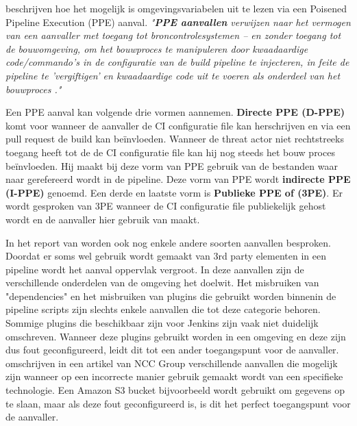 \textcite{Security2022} beschrijven hoe het mogelijk is omgevingsvariabelen uit te lezen via een Poisened Pipeline Execution (PPE) aanval. {\centering\textit{"\textbf{PPE aanvallen} verwijzen naar het vermogen van een aanvaller met toegang tot broncontrolesystemen – en zonder toegang tot de bouwomgeving, om het bouwproces te manipuleren door kwaadaardige code/commando's in de configuratie van de build pipeline te injecteren, in feite de pipeline te 'vergiftigen' en kwaadaardige code uit te voeren als onderdeel van het bouwproces \autocite{Security2022}."}}
\newline

Een PPE aanval kan volgende drie vormen aannemen. \textbf{Directe PPE (D-PPE)} komt voor wanneer de aanvaller de CI configuratie file kan herschrijven en via een pull request de build kan beïnvloeden. Wanneer de threat actor niet rechtstreeks toegang heeft tot de de CI configuratie file kan hij nog steeds het bouw proces beïnvloeden. Hij maakt bij deze vorm van PPE gebruik van de bestanden waar naar gerefereerd wordt in de pipeline. Deze vorm van PPE wordt \textbf{indirecte PPE (I-PPE)} genoemd. Een derde en laatste vorm is \textbf{Publieke PPE of (3PE)}. Er wordt gesproken van 3PE wanneer de CI configuratie file publiekelijk gehost wordt en de aanvaller hier gebruik van maakt.
\newline

In het report van \textcite{Security2022} worden ook nog enkele andere soorten aanvallen besproken. Doordat er soms wel gebruik wordt gemaakt van 3rd party elementen in een pipeline wordt het aanval oppervlak vergroot. In deze aanvallen zijn de verschillende onderdelen van de omgeving het doelwit. Het misbruiken van "dependencies" en het misbruiken van plugins die gebruikt worden binnenin de pipeline scripts zijn slechts enkele aanvallen die tot deze categorie behoren. Sommige plugins die beschikbaar zijn voor Jenkins zijn vaak niet duidelijk omschreven. Wanneer deze plugins gebruikt worden in een omgeving en deze zijn dus fout geconfigureerd, leidt dit tot een ander toegangspunt voor de aanvaller. \autocite{Haymore2022} omschrijven in een artikel van NCC Group verschillende aanvallen die mogelijk zijn wanneer op een incorrecte manier gebruik gemaakt wordt van een specifieke technologie. Een Amazon S3 bucket bijvoorbeeld wordt gebruikt om gegevens op te slaan, maar als deze fout geconfigureerd is, is dit het perfect toegangspunt voor de aanvaller. 

